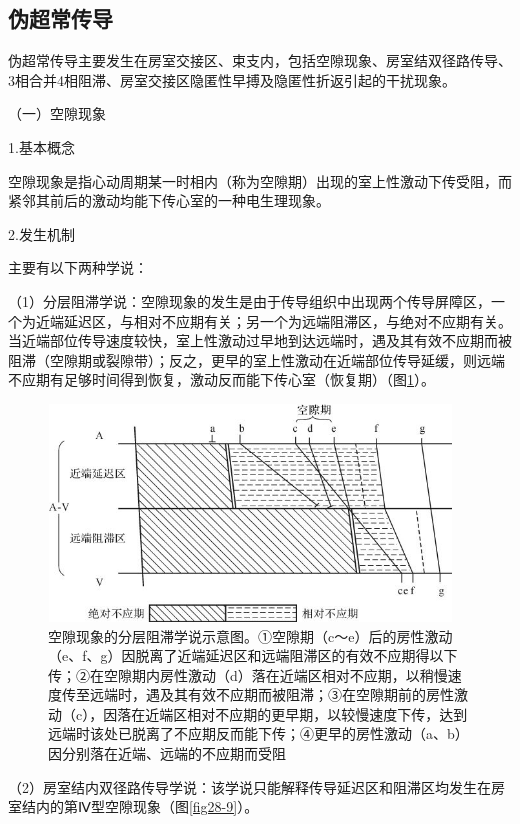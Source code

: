 \subsection{伪超常传导}

伪超常传导主要发生在房室交接区、束支内，包括空隙现象、房室结双径路传导、3相合并4相阻滞、房室交接区隐匿性早搏及隐匿性折返引起的干扰现象。

（一）空隙现象

1.基本概念

空隙现象是指心动周期某一时相内（称为空隙期）出现的室上性激动下传受阻，而紧邻其前后的激动均能下传心室的一种电生理现象。

2.发生机制

主要有以下两种学说：

（1）分层阻滞学说：空隙现象的发生是由于传导组织中出现两个传导屏障区，一个为近端延迟区，与相对不应期有关；另一个为远端阻滞区，与绝对不应期有关。当近端部位传导速度较快，室上性激动过早地到达远端时，遇及其有效不应期而被阻滞（空隙期或裂隙带）；反之，更早的室上性激动在近端部位传导延缓，则远端不应期有足够时间得到恢复，激动反而能下传心室（恢复期）（图\ref{fig28-8}）。

\begin{figure}[!htbp]
 \centering
 \includegraphics[width=4.21875in,height=2.27083in]{./images/Image00468.jpg}
 \captionsetup{justification=centering}
 \caption{空隙现象的分层阻滞学说示意图。①空隙期（c～e）后的房性激动（e、f、g）因脱离了近端延迟区和远端阻滞区的有效不应期得以下传；②在空隙期内房性激动（d）落在近端区相对不应期，以稍慢速度传至远端时，遇及其有效不应期而被阻滞；③在空隙期前的房性激动（c），因落在近端区相对不应期的更早期，以较慢速度下传，达到远端时该处已脱离了不应期反而能下传；④更早的房性激动（a、b）因分别落在近端、远端的不应期而受阻}
 \label{fig28-8}
  \end{figure} 

（2）房室结内双径路传导学说：该学说只能解释传导延迟区和阻滞区均发生在房室结内的第Ⅳ型空隙现象（图\ref{fig28-9}）。


